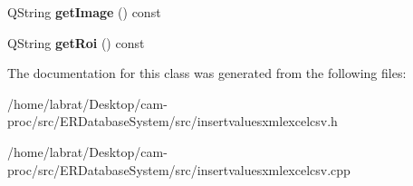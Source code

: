 \begin{DoxyCompactItemize}
\item 
Q\+String {\bfseries get\+Image} () const \hypertarget{classinsertValuesXmlExcelCsv_a6e78aee24e7e873d2c2eb03f7ff3095d}{}\label{classinsertValuesXmlExcelCsv_a6e78aee24e7e873d2c2eb03f7ff3095d}

\item 
Q\+String {\bfseries get\+Roi} () const \hypertarget{classinsertValuesXmlExcelCsv_a7bb93a9f889adebe8b9bf311a8bd3d7c}{}\label{classinsertValuesXmlExcelCsv_a7bb93a9f889adebe8b9bf311a8bd3d7c}

\end{DoxyCompactItemize}


The documentation for this class was generated from the following files\+:\begin{DoxyCompactItemize}
\item 
/home/labrat/\+Desktop/cam-\/proc/src/\+E\+R\+Database\+System/src/insertvaluesxmlexcelcsv.\+h\item 
/home/labrat/\+Desktop/cam-\/proc/src/\+E\+R\+Database\+System/src/insertvaluesxmlexcelcsv.\+cpp\end{DoxyCompactItemize}
